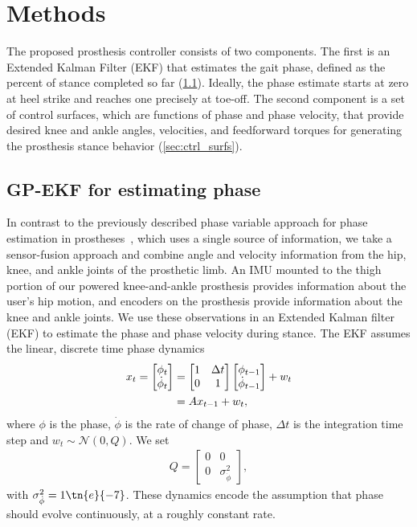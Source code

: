\section{Methods}\label{sec:phase_est_methods}

The proposed prosthesis controller consists of two components. The first is an
Extended Kalman Filter (EKF) that estimates the gait phase, defined as the
percent of stance completed so far (\cref{sec:gpekf}). Ideally, the phase
estimate starts at zero at heel strike and reaches one precisely at toe-off. The
second component is a set of control surfaces, which are functions of phase and
phase velocity, that provide desired knee and ankle angles, velocities, and
feedforward torques for generating the prosthesis stance behavior
(\cref{sec:ctrl_surfs}).

\subsection{GP-EKF for estimating phase}\label{sec:gpekf}

In contrast to the previously described phase variable approach for phase
estimation in prostheses~\citep{quintero2016preliminary}, which uses a single
source of information, we take a sensor-fusion approach and combine angle and
velocity information from the hip, knee, and ankle joints of the prosthetic
limb.  An IMU mounted to the thigh portion of our powered knee-and-ankle
prosthesis provides information about the user's hip motion, and encoders on the
prosthesis provide information about the knee and ankle joints. We use these
observations in an Extended Kalman filter (EKF) to estimate the phase and phase
velocity during stance. The EKF assumes the linear, discrete time phase dynamics
\begin{align}
    x_t = \begin{bmatrix} \phi_t \\ \dot{\phi}_t \end{bmatrix} 
        &= \begin{bmatrix} 1 & \Delta t \\ 0 & 1 \end{bmatrix} 
            \begin{bmatrix} \phi_{t-1} \\ \dot{\phi}_{t-1} \end{bmatrix} + w_t
            \label{eq:dyn_mdl} \\
        &= A x_{t-1} + w_t, \notag
\end{align}
where $\phi$ is the phase, $\dot{\phi}$ is the rate of change of phase, $\Delta
t$ is the integration time step and $w_t \sim \mathcal{N}(0, Q)$. We set
\begin{align}
    Q = \begin{bmatrix} 0 & 0 \\ 0 & \sigma_{\dot{\phi}}^2 \end{bmatrix},
\end{align}
with $\sigma_{\dot{\phi}}^2 = 1\tn{e}{-7}$. These dynamics encode the
assumption that phase should evolve continuously, at a roughly constant rate.

